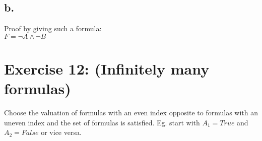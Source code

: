 \documentclass[12pt]{article}
\begin{document}
\subsection*{b.}

Proof by giving such a formula:\\
$F = \neg A \land \neg B$

\section*{Exercise 12: (Infinitely many formulas)}
Choose the valuation of formulas with an even index opposite to formulas with an uneven index and the set of formulas is satisfied. Eg. start with $A_1 = True$ and $A_2 = False$ or vice versa.

\end{document}
